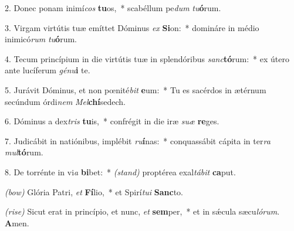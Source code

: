 2. Donec ponam inimí\textit{cos} \textbf{tu}os,~* scabéllum pe\textit{dum} \textit{tu}\textbf{ó}rum.

3. Virgam virtútis tuæ emíttet Dóminus \textit{ex} \textbf{Si}on:~* domináre in médio inimicó\textit{rum} \textit{tu}\textbf{ó}rum.

4. Tecum princípium in die virtútis tuæ in splendóribus \textit{sanc}\textbf{tó}rum:~* ex útero ante lucíferum \textit{gé}\textit{nu}\textbf{i} te.

5. Jurávit Dóminus, et non p{\oe}nité\textit{bit} \textbf{e}um:~*
Tu es sacérdos in ætérnum secúndum órdi\textit{nem} \textit{Mel}\textbf{chí}se\-dech.

6. Dóminus a dex\textit{tris} \textbf{tu}is,~* confrégit in die iræ \textit{su}\textit{æ} \textbf{re}ges.

7. Judicábit in natiónibus, implébit \textit{ru}\textbf{í}nas:~* conquassábit cápita in ter\textit{ra} \textit{mul}\textbf{tó}rum.

8. De torrénte in vi\textit{a} \textbf{bi}bet:~* {\color{red}\textit{(stand)}} proptérea exal\textit{tá}\textit{bit} \textbf{ca}put.

{\color{red}\textit{(bow)}} Glória Patri, \textit{et} \textbf{Fí}lio,~* et Spirí\textit{tu}\textit{i} \textbf{Sanc}to.

{\color{red}\textit{(rise)}} Sicut erat in princípio, et nunc, \textit{et} \textbf{sem}per,~* et in s\'{\ae}cula sæcu\textit{ló}\textit{rum}. \textbf{A}men.